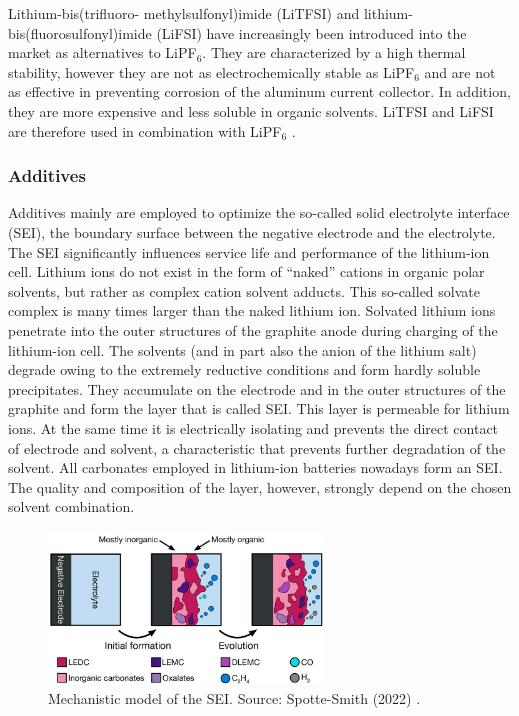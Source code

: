 Lithium-bis(trifluoro- methylsulfonyl)imide (LiTFSI) and lithium-bis(fluorosulfonyl)imide (LiFSI) have increasingly been introduced into the market as alternatives to LiPF$_6$. They are characterized by a high thermal stability, however they are not as electrochemically stable as LiPF$_6$ and are not as effective in preventing corrosion of the aluminum current collector. In addition, they are more expensive and less soluble in organic solvents. LiTFSI and LiFSI are therefore used in combination with LiPF$_6$ \cite{xu2004nonaqueous}.

\subsubsection{Additives}
\label{sec:additives}
Additives mainly are employed to optimize the so-called solid electrolyte interface (SEI), the boundary surface between the negative electrode and the electrolyte. The SEI significantly influences service life and performance of the lithium-ion cell.
Lithium ions do not exist in the form of “naked” cations in organic polar solvents, but rather as complex cation solvent adducts. This so-called solvate complex is many times larger than the naked lithium ion.
Solvated lithium ions penetrate into the outer structures of the graphite anode during charging of the lithium-ion cell. The solvents (and in part also the anion of the lithium salt) degrade owing to the extremely reductive conditions and form hardly soluble precipitates. They accumulate on the electrode and in the outer structures of the graphite and form the layer that is called SEI.
This layer is permeable for lithium ions. At the same time it is electrically isolating and prevents the direct contact of electrode and solvent, a characteristic that prevents further degradation of the solvent. All carbonates employed in lithium-ion batteries nowadays form an SEI. The quality and composition of the layer, however, strongly depend on the chosen solvent combination.

\begin{figure}[ht]
    \centering
    \includegraphics[width=0.65\textwidth]{Images/Chapter1/sei.jpeg}
    \caption[Mechanistic model of the SEI]{Mechanistic model of the SEI. Source: Spotte-Smith (2022) \cite{spotte2022toward}.}
    \label{fig:sei}
\end{figure}

